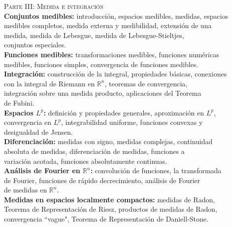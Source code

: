 \documentclass[12pt,letterpaper]{article}
\newcommand\tab[1][1.5cm]{\hspace*{#1}}
\begin{document}
\tab \textsc{Parte III: Medida e integración}\\
\tab \qquad \textbf{Conjuntos medibles:} introducción, espacios medibles, medidas, espacios \\
	\tab \qquad \qquad medibles completos, medida externa y medibilidad, extensión de una \\
	\tab \qquad \qquad medida, medida de Lebesgue, medida de Lebesgue-Stieltjes, \\
	\tab \qquad \qquad conjuntos especiales.\\
\tab \qquad \textbf{Funciones medibles:} transformaciones medibles, funciones numéricas \\
	\tab \qquad \qquad medibles, funciones simples, convergencia de funciones medibles.\\
\tab \qquad \textbf{Integración:} construcción de la integral, propiedades básicas, conexiones \\
	\tab \qquad \qquad con la integral de Riemann en $\mathbb{R}^n$, teoremas de convergencia, \\
	\tab \qquad \qquad integración sobre una medida producto, aplicaciones del Teorema \\
	\tab \qquad \qquad de Fubini.\\
\tab \qquad \textbf{Espacios $L^p$:} definición y propiedades generales, aproximación en $L^p$, \\
	\tab \qquad \qquad convergencia en $L^p$, integrabilidad uniforme, funciones convexas y \\
	\tab \qquad \qquad desigualdad de Jensen.\\
\tab \qquad \textbf{Diferenciación:} medidas con signo, medidas complejas, continuidad \\
	\tab \qquad \qquad absoluta de medidas, diferenciación de medidas, funciones a \\
	\tab \qquad \qquad variación acotada, funciones absolutamente continuas.\\
\tab \qquad \textbf{Análisis de Fourier en $\mathbb{R}^n$:} convolución de funciones, la transformada \\
	\tab \qquad \qquad de Fourier, funciones de rápido decrecimiento, análisis de Fourier \\
	\tab \qquad \qquad de medidas en $\mathbb{R}^n$.\\ 
\tab \qquad \textbf{Medidas en espacios localmente compactos:} medidas de Radon, \\
	\tab \qquad \qquad Teorema de Representación de Riesz, productos de medidas de Radon, \\
	\tab \qquad \qquad convergencia ``vague", Teorema de Representación de Daniell-Stone.\\
	
\end{document}
